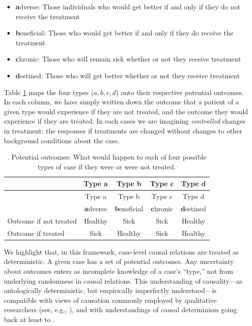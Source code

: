 \documentclass[
  12pt,
]{book}
\providecommand{\tightlist}{%
  \setlength{\itemsep}{0pt}\setlength{\parskip}{0pt}}
\begin{document}
\begin{itemize}
\tightlist
\item
  \textbf{a}dverse: Those individuals who would get better if and only if they do not receive the treatment
\item
  \textbf{b}eneficial: Those who would get better if and only if they do receive the treatment
\item
  \textbf{c}hronic: Those who will remain sick whether or not they receive treatment
\item
  \textbf{d}estined: Those who will get better whether or not they receive treatment
\end{itemize}

Table \ref{tab:PO} maps the four types (\(a, b, c, d\)) onto their respective potential outcomes. In each column, we have simply written down the outcome that a patient of a given type would experience if they are not treated, and the outcome they would experience if they are treated. In each cases we are imagining \emph{controlled} changes in treatment: the responses if treatments are changed without changes to other background conditions about the case.

\begin{longtable}[]{@{}lcccc@{}}
\caption{\label{tab:PO}. Potential outcomes: What would happen to each of four possible types of case if they were or were not treated.}\tabularnewline
\toprule
\small & Type a & Type b & Type c & Type d \\
\midrule
\endfirsthead
\toprule
\small & Type a & Type b & Type c & Type d \\
\midrule
\endhead
& \textbf{a}dverse & \textbf{b}eneficial & \textbf{c}hronic & \textbf{d}estined \\
Outcome if not treated & Healthy & Sick & Sick & Healthy \\
Outcome if treated & Sick & Healthy & Sick & Healthy \\
\bottomrule
\end{longtable}

We highlight that, in this framework, case-level causal relations are treated as deterministic. A given case has a set of potential outcomes. Any uncertainty about outcomes enters as incomplete knowledge of a case's ``type,'' not from underlying randomness in causal relations. This understanding of causality---as ontologically deterministic, but empirically imperfectly understood---is compatible with views of causation commonly employed by qualitative researchers (see, e.g., \citet{mahoney2008toward}), and with understandings of causal determinism going back at least to \citet{laplace1901philosophical}.
\end{document}
